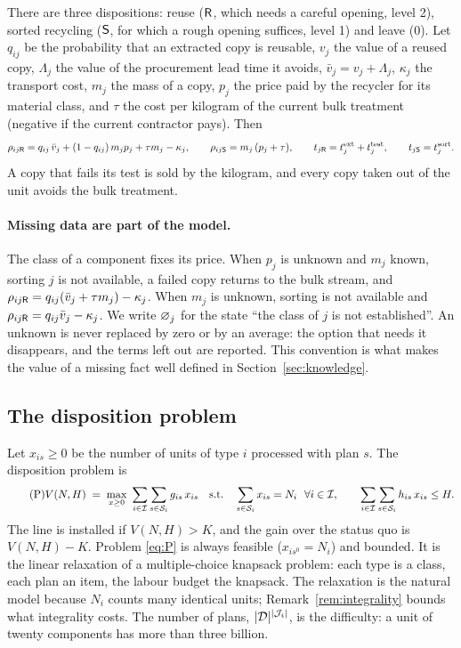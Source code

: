 There are three dispositions: reuse ($\mathsf{R}$, which needs a careful opening, level 2), sorted recycling ($\mathsf{S}$, for
which a rough opening suffices, level 1) and leave ($0$). Let $q_{ij}$ be the probability that an extracted copy is
reusable, $v_j$ the value of a reused copy, $\Lambda_j$ the value of the procurement lead time it avoids,
$\bar v_j=v_j+\Lambda_j$, $\kappa_j$ the transport cost, $m_j$ the mass of a copy, $p_j$ the price paid by the
recycler for its material class, and $\tau$ the cost per kilogram of the current bulk treatment (negative if the
current contractor pays). Then
\begin{equation}\label{eq:values}
\rho_{ij\mathsf{R}}=q_{ij}\,\bar v_j+(1-q_{ij})\,m_jp_j+\tau m_j-\kappa_j,\qquad \rho_{ij\mathsf{S}}=m_j\,(p_j+\tau),
\qquad t_{j\mathsf{R}}=t^{\mathrm{ext}}_j+t^{\mathrm{test}}_j,\qquad t_{j\mathsf{S}}=t^{\mathrm{sort}}_j .
\end{equation}
A copy that fails its test is sold by the kilogram, and every copy taken out of the unit avoids the bulk treatment.

\paragraph{Missing data are part of the model.} The class of a component fixes its price. When $p_j$ is unknown
and $m_j$ known, sorting $j$ is not available, a failed copy returns to the bulk stream, and
$\rho_{ij\mathsf{R}}=q_{ij}(\bar v_j+\tau m_j)-\kappa_j$. When $m_j$ is unknown, sorting is not available and
$\rho_{ij\mathsf{R}}=q_{ij}\bar v_j-\kappa_j$. We write $\varnothing_j$ for the state ``the class of $j$ is not established''.
An unknown is never replaced by zero or by an average: the option that needs it disappears, and the terms left out
are reported. This convention is what makes the value of a missing fact well defined in Section~\ref{sec:knowledge}.

\subsection{The disposition problem}

Let $x_{is}\ge 0$ be the number of units of type $i$ processed with plan $s$. The disposition problem is
\begin{equation}\tag{P}\label{eq:P}
V(N,H)\;=\;\max_{x\ge 0}\ \sum_{i\in\mathcal{I}}\sum_{s\in\mathcal{S}_i}g_{is}\,x_{is}
\quad\text{s.t.}\quad \sum_{s\in\mathcal{S}_i}x_{is}=N_i\ \ \forall i\in\mathcal{I},\qquad
\sum_{i\in\mathcal{I}}\sum_{s\in\mathcal{S}_i}h_{is}\,x_{is}\le H .
\end{equation}
The line is installed if $V(N,H)>K$, and the gain over the status quo is $V(N,H)-K$. Problem \eqref{eq:P} is always
feasible ($x_{is^0}=N_i$) and bounded. It is the linear relaxation of a multiple-choice knapsack problem: each type
is a class, each plan an item, the labour budget the knapsack. The relaxation is the natural model because $N_i$
counts many identical units; Remark~\ref{rem:integrality} bounds what integrality costs. The number of plans,
$|\mathcal{D}|^{|\mathcal{J}_i|}$, is the difficulty: a unit of twenty components has more than three billion.

